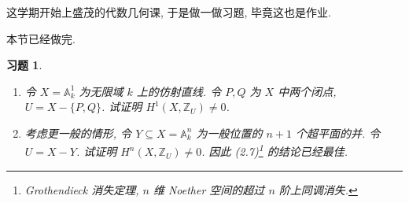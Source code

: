 \documentclass{article}
\theoremstyle{exercise}
\newtheorem{exercise}{习题}[section]
\theoremstyle{plain}
\theoremstyle{remark}
\def\printfootnotes{}
\def\A{\mathbb{A}}
\def\Z{\mathbb{Z}}
\def\clearfootnotes{}
\begin{document}
这学期开始上盛茂的代数几何课, 于是做一做习题, 毕竟这也是作业.

本节已经做完.

\setcounter{section}{2}

\begin{exercise} \hfill
  \begin{enumerate}
    \item 令 $X = \A_k^1$ 为无限域 $k$ 上的仿射直线.
          令 $P, Q$ 为 $X$ 中两个闭点, $U = X - \{P, Q\}$.
          试证明 $H^1(X, \Z_U) \neq 0$.
    \item 考虑更一般的情形,
          令 $Y \subseteq X = \A_k^n$ 为一般位置的 $n + 1$ 个超平面的并.
          令 $U = X - Y$. 试证明 $H^n(X, \Z_U) \neq 0$.
          因此 (2.7)\footnote{
          Grothendieck 消失定理, $n$ 维 Noether 空间的超过 $n$ 阶上同调消失.}
          的结论已经最佳.
  \end{enumerate}
\end{exercise}
\printfootnotes
\clearfootnotes
\end{document}
